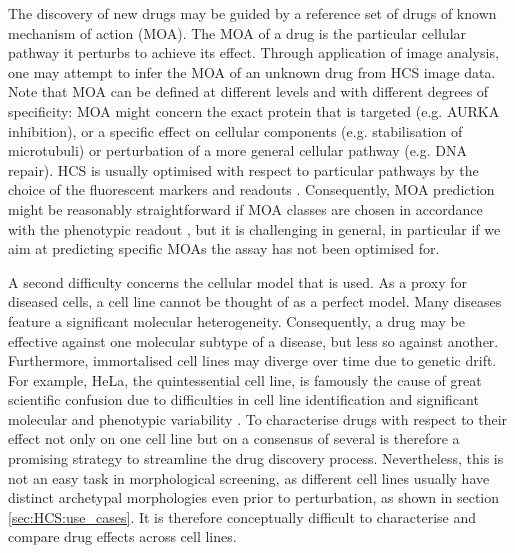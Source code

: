 The discovery of new drugs may be guided by a reference set of drugs of known mechanism of action (MOA). The MOA of a drug is the particular cellular pathway it perturbs to achieve its effect. Through application of image analysis, one may attempt to infer the MOA of an unknown drug from HCS image data. Note that MOA can be defined at different levels and with different degrees of specificity: MOA might concern the exact protein that is targeted (e.g. AURKA inhibition), or a specific effect on cellular components (e.g. stabilisation of microtubuli) or perturbation of a more general cellular pathway (e.g. DNA repair). HCS is usually optimised with respect to particular pathways by the choice of the fluorescent markers and readouts {\cite{pepperkok2006}}. {Consequently, MOA prediction might be reasonably straightforward if MOA classes are chosen in accordance with the phenotypic readout \cite{ljosa2013comparison}}, but it is challenging in general, in particular if we aim at predicting specific MOAs the assay has not been optimised for.




A second difficulty concerns the cellular model that is used. As a proxy for diseased cells, a cell line cannot be thought of as a perfect model. Many diseases feature a significant molecular heterogeneity. Consequently, a drug may be effective against one molecular subtype of a disease, but less so against another. Furthermore, immortalised cell lines may diverge over time due to genetic drift. For example, HeLa, the quintessential cell line, is famously the cause of great scientific confusion {due to difficulties in cell line identification \cite{horbach2017ghosts} and significant molecular and phenotypic variability \cite{liu2019multi}}. To characterise drugs with respect to their effect not only on one cell line but on a consensus of several is therefore a promising strategy to streamline the drug discovery process. Nevertheless, this is not an easy task in morphological screening, as different cell lines usually have distinct archetypal morphologies even prior to perturbation, as shown in section \ref{sec:HCS:use_cases}. It is therefore conceptually difficult to characterise and compare drug effects across cell lines.

